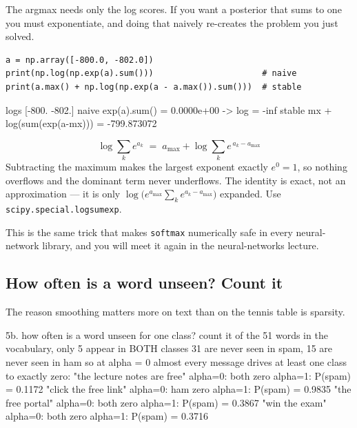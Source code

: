 \documentclass[11pt]{article}
\begin{document}
The argmax needs only the log scores. If you want a posterior that sums to
one you must exponentiate, and doing that naively re-creates the problem you
just solved.

\begin{lstlisting}
a = np.array([-800.0, -802.0])
print(np.log(np.exp(a).sum()))                      # naive
print(a.max() + np.log(np.exp(a - a.max()).sum()))  # stable
\end{lstlisting}
\begin{codeout}
   logs [-800. -802.]
   naive  exp(a).sum() = 0.0000e+00  -> log = -inf
   stable mx + log(sum(exp(a-mx))) = -799.873072
\end{codeout}

\begin{keyidea}
\[
  \log \sum_k e^{a_k} \;=\; a_{\max} + \log \sum_k e^{\,a_k - a_{\max}}
\]
Subtracting the maximum makes the largest exponent exactly $e^0 = 1$, so
nothing overflows and the dominant term never underflows. The identity is
exact, not an approximation --- it is only
$\log\bigl(e^{a_{\max}}\sum_k e^{a_k - a_{\max}}\bigr)$ expanded.
Use \texttt{scipy.special.logsumexp}.
\end{keyidea}

This is the same trick that makes \texttt{softmax} numerically safe in every
neural-network library, and you will meet it again in the neural-networks
lecture.

\subsection{How often is a word unseen? Count it}

The reason smoothing matters more on text than on the tennis table is
sparsity.

\begin{codeout}
5b. how often is a word unseen for one class? count it
   of the 51 words in the vocabulary, only 5 appear in BOTH classes
   31 are never seen in spam, 15 are never seen in ham
   so at alpha = 0 almost every message drives at least one class to exactly zero:
      "the lecture notes are free"    alpha=0: both zero      alpha=1: P(spam) = 0.1172
      "click the free link"           alpha=0: ham zero       alpha=1: P(spam) = 0.9835
      "the free portal"               alpha=0: both zero      alpha=1: P(spam) = 0.3867
      "win the exam"                  alpha=0: both zero      alpha=1: P(spam) = 0.3716
\end{codeout}
\end{document}
